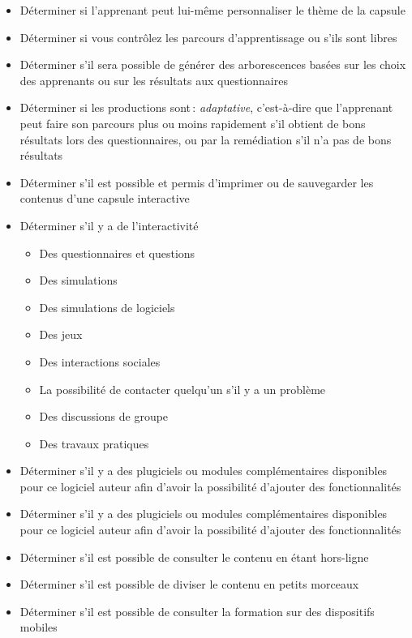 {\begin{itemize}
\begin{itemize}
\item  Recherche
\end{itemize} 
\item  Déterminer si l'apprenant peut lui-même personnaliser le thème de la capsule 
\item  Déterminer si vous contrôlez les parcours d'apprentissage ou s'ils sont libres 
\item  Déterminer s'il sera possible de générer des arborescences basées sur les choix des apprenants ou sur les résultats aux questionnaires
\item  Déterminer si les productions sont\,: \textit{adaptative}, c'est-à-dire que l'apprenant peut faire son parcours plus ou moins rapidement s'il obtient de bons résultats lors des questionnaires, ou par la remédiation s'il n'a pas de bons résultats
\item Déterminer s'il est possible et permis d'imprimer ou de sauvegarder les contenus d'une capsule interactive
\framebreak
\item Déterminer s'il y a de l'interactivité
\begin{itemize} 
\item Des questionnaires et questions
\item Des simulations
\item Des simulations de logiciels
\item Des jeux
\item Des interactions sociales
\item La possibilité de contacter quelqu'un s'il y a un problème
\item Des discussions de groupe
\item Des travaux pratiques
\end{itemize} 
\item Déterminer s'il y a des plugiciels ou modules complémentaires disponibles pour ce logiciel auteur afin d'avoir la possibilité d'ajouter des fonctionnalités
\item Déterminer s'il y a des plugiciels ou modules complémentaires disponibles pour ce logiciel auteur afin d'avoir la possibilité d'ajouter des fonctionnalités
\item Déterminer s'il est possible de consulter le contenu en étant hors-ligne
\item Déterminer s'il est possible de diviser le contenu en petits morceaux
\item Déterminer s'il est possible de consulter la formation sur des dispositifs mobiles 
\begin{itemize}

\end{itemize}
\end{itemize}}
